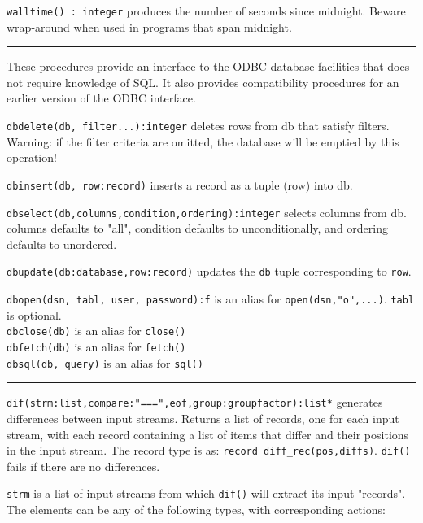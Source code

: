 \texttt{walltime() : integer} produces the number of seconds since
midnight. Beware wrap-around when used in programs that span midnight.

\vspace{0.25cm}\hrule{}

These procedures provide an interface to the ODBC database facilities
that does not require knowledge of SQL. It also provides compatibility
procedures for an earlier version of the ODBC interface.

\texttt{dbdelete(db, filter...):integer} deletes rows from db that satisfy
filters. Warning: if the filter criteria are omitted, the
database will be emptied by this operation!

\texttt{dbinsert(db, row:record)} inserts a record as a tuple (row) into db.

\texttt{dbselect(db,columns,condition,ordering):integer} selects columns from db.
columns defaults to "all", condition
defaults to unconditionally, and ordering defaults to unordered.

\texttt{dbupdate(db:database,row:record)} updates the \texttt{db} tuple
corresponding to \texttt{row}.

\texttt{dbopen(dsn, tabl, user, password):f} is an alias for
\texttt{open(dsn,"o",...)}. \texttt{tabl} is optional.\\
\texttt{dbclose(db)} is an alias for \texttt{close()}\\
\texttt{dbfetch(db)} is an alias for \texttt{fetch()}\\
\texttt{dbsql(db, query)} is an alias for \texttt{sql()}

\vspace{0.25cm}\hrule{}

\texttt{dif(strm:list,compare:"===",eof,group:groupfactor):list*}
generates differences between input streams. 
Returns a list of records, one for each input stream, with each
record containing a list of items that differ and their positions in
the input stream. The record type is as: \texttt{record
diff\_rec(pos,diffs)}. \texttt{dif()} fails if there are no
differences.

\texttt{strm} is a list of input streams from which \texttt{dif()} will
extract its input "records". The elements
can be any of the following types, with corresponding actions:

